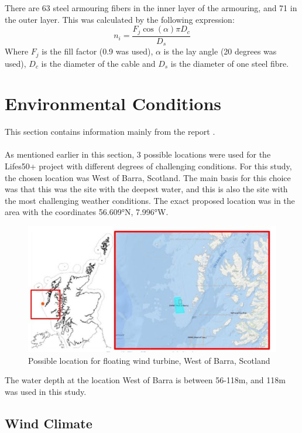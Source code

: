 \noindent There are 63 steel armouring fibers in the inner layer of the armouring, and 71 in the outer layer. This was calculated by the following expression:
\begin{equation}
    n_i=\frac{F_j\cos(\alpha)\pi D_c}{D_s}
\end{equation}
Where $F_j$ is the fill factor (0.9 was used), $\alpha$ is the lay angle (20 degrees was used), $D_c$ is the diameter of the cable and $D_s$ is the diameter of one steel fibre. 

\section{Environmental Conditions}
 This section contains information mainly from the report \cite{Lifes50+D1.1}.\\\\As mentioned earlier in this section, 3 possible locations were used for the Lifes50+ project with different degrees of challenging conditions. For this study, the chosen location was West of Barra, Scotland. The main basis for this choice was that this was the site with the deepest water, and this is also the site with the most challenging weather conditions. The exact proposed location was in the area with the coordinates 56.609°N, 7.996°W. 


\begin{figure}[H]
\centering
\includegraphics[scale=0.8]{figures/wob}
\caption[$\; \:$West of Barra, Scotland]{Possible location for floating wind turbine, West of Barra, Scotland \cite{Lifes50+D1.1} }
 \label{fig:wob}
\end{figure}

\noindent The water depth at the location West of Barra is between 56-118m, and 118m was used in this study.

\subsection{Wind Climate}
\label{sec:windcli}

